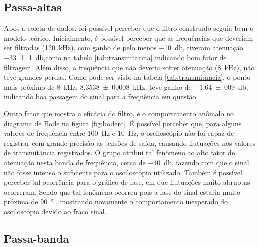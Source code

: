 
\subsection{Passa-altas}

  Após a coleta de dados, foi possível perceber que o filtro construído seguia bem o modelo teórico. Inicialmente, é possível perceber que as frequências que deveriam ser filtradas (\SI{120}{\kilo\hertz}), com ganho de pelo menos \SI{-10}{\decibel}, tiveram atenuação \SI{-33(1)}{\decibel},como na tabela \ref{tab:transmitancia} indicando bom fator de filtragem. Além disso, a frequência que não deveria sofrer atenuação (\SI{8}{\kilo\hertz}), não teve grandes perdas. Como pode ser visto na tabela \ref{tab:transmitancia}, o ponto mais próximo de \SI{8}{\kilo\hertz}, \SI{8,3538(00008)}{\kilo\hertz}, teve ganho de \SI{-1,64(009)}{\decibel}, indicando boa passagem do sinal para a frequência em questão.\par
  Outro fator que mostra a eficácia do filtro, é o comportamento anômalo no diagrama de Bode na figura \ref{fig:boderc}. É possível perceber que, para alguns valores de frequência entre \SI{100}{\hertz} e \SI{10}{\hertz}, o osciloscópio não foi capaz de registrar com grande precisão as tensões de saída, causando flutuações nos valores de transmitância registrados. O grupo atribui tal fenômeno ao alto fator de atenuação nesta banda de frequência, cerca de \SI{-40}{\decibel}, fazendo com que o sinal não fosse intenso o suficiente para o osciloscópio utilizado. Também é possível perceber tal ocorrência para o gráfico de fase, em que flutuações muito abruptas ocorreram. Sendo que tal fenômeno ocorreu pois a fase do sinal estaria muito próxima de \SI{90}{\degree}
  , mostrando novamente o comportamento inesperado do osciloscópio devido ao fraco sinal.
  \pagebreak
  
  \subsection{Passa-banda}